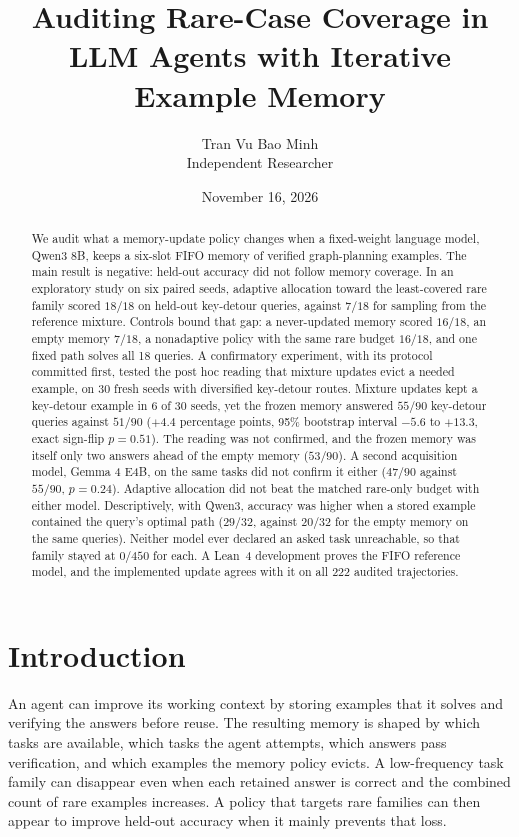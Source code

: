 \documentclass[11pt]{article}
\title{Auditing Rare-Case Coverage in LLM Agents with Iterative Example Memory}
\author{Tran Vu Bao Minh\\Independent Researcher}
\date{November 16, 2026}
\begin{document}
\maketitle

\begin{abstract}
We audit what a memory-update policy changes when a fixed-weight
language model, Qwen3 8B, keeps a six-slot FIFO memory of verified
graph-planning examples. The main result is negative: held-out accuracy
did not follow memory coverage. In an exploratory study on six paired
seeds, adaptive allocation toward the least-covered rare family scored
$18/18$ on held-out key-detour queries, against $7/18$ for sampling
from the reference mixture. Controls bound that gap: a never-updated
memory scored $16/18$, an empty memory $7/18$, a nonadaptive policy
with the same rare budget $16/18$, and one fixed path solves all 18
queries. A confirmatory experiment, with its protocol committed
first, tested the post hoc reading that mixture updates evict a needed
example, on 30 fresh seeds with diversified key-detour routes.
Mixture updates kept a key-detour example in 6 of 30 seeds, yet the
frozen memory answered $55/90$ key-detour queries against $51/90$
($+4.4$ percentage points, 95\% bootstrap interval $-5.6$ to $+13.3$,
exact sign-flip $p=0.51$). The reading was not confirmed, and the
frozen memory was itself only two answers ahead of the empty memory
($53/90$). A second acquisition model, Gemma 4 E4B, on the same tasks
did not confirm it either ($47/90$ against $55/90$, $p=0.24$). Adaptive
allocation did not beat the matched rare-only budget with either model.
Descriptively, with Qwen3, accuracy was higher when a stored example
contained the query's optimal path ($29/32$, against $20/32$ for the
empty memory on the same queries). Neither model ever declared an
asked task unreachable, so that family stayed at $0/450$ for each. A Lean~4 development
proves the FIFO reference model, and the implemented update agrees with
it on all 222 audited trajectories.
\end{abstract}


\section{Introduction}

An agent can improve its working context by storing examples that it
solves and verifying the answers before reuse. The resulting memory is
shaped by which tasks are available, which tasks the agent attempts,
which answers pass verification, and which examples the memory policy
evicts. A low-frequency task family can disappear even when each
retained answer is correct and the combined count of rare examples
increases. A policy that targets rare families can then appear to
improve held-out accuracy when it mainly prevents that loss.
\end{document}
